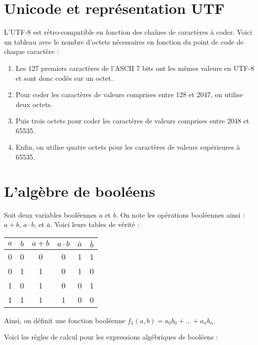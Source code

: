 \documentclass{article}
\begin{document}
		\section{Unicode et représentation UTF}
			L'UTF-8 est rétro-compatible en fonction des chaînes de caractères à coder. Voici un tableau avec le nombre d'octets nécessaires en fonction du point de code de chaque caractère : 
		
			\begin{enumerate}
				\item Les 127 premiers caractères de l'ASCII 7 bits ont les mêmes valeurs en UTF-8 et sont donc codés sur un octet.
				\item Pour coder les caractères de valeurs comprises entre 128 et 2047, on utilise deux octets.
				\item Puis trois octets pour coder les caractères de valeurs comprises entre 2048 et 65535.
				\item Enfin, on utilise quatre octets pour les caractères de valeurs supérieures à 65535.
			\end{enumerate}
			
		\section{L'algèbre de booléens}
			Soit deux variables booléennes $a$ et $b$. On note les opérations booléennes ainsi : $a + b$, $a \cdot b$, et $\bar{a}$. Voici leurs tables de vérité :
		
			\begin{center}
				\begin{tabular}{ | c | c | c | c | c | c | }
					\hline
						$a$ & $b$ & $a + b$ & $a \cdot b$ & $\bar{a}$ & $\bar{b}$  \\
					\hline
						0 & 0 & 0 & 0 & 1 & 1 \\
					\hline					
						0 & 1 & 1 & 0 & 1 & 0 \\
					\hline					
						1 & 0 & 1 & 0 & 0 & 1 \\
					\hline
						1 & 1 & 1 & 1 & 0 & 0 \\						
					\hline
				\end{tabular}
			\end{center}
			
			Ainsi, on définit une fonction booléenne $f_1(a, b) = a_0 b_0 + \ldots + a_n b_n$.
			
			Voici les règles de calcul pour les expressions algébriques de booléens :
			
\end{document}
